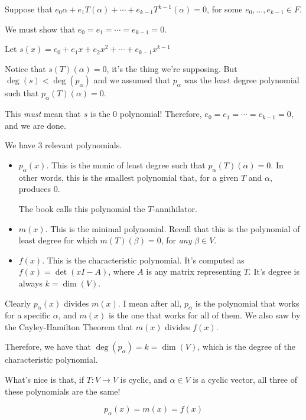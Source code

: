 \documentclass[12pt]{article}
\begin{document}
\begin{enumerate}
      Suppose that $e_0 \alpha + e_1 T(\alpha) + \cdots + e_{k - 1} T^{k - 1}
      (\alpha) = 0$, for some $e_0, \dots, e_{k - 1} \in F$.

      We must show that $e_0 = e_1 = \cdots = e_{k - 1} = 0$.

      Let $s(x) = e_0 + e_1 x + e_2 x^2 + \cdots + e_{k - 1} x^{k - 1}$

      Notice that $s(T)(\alpha) = 0$, it's the thing we're supposing. But
      $\deg(s) < \deg(p_\alpha)$ and we assumed that $p_\alpha$ was the least
      degree polynomial such that $p_\alpha(T)(\alpha) = 0$.

      This {\it must} mean that $s$ is the 0 polynomial! Therefore, $e_0 = e_1 =
      \cdots = e_{k - 1} = 0$, and we are done.
  \end{enumerate}

  We have 3 relevant polynomials.

  \begin{itemize}
    \item $p_\alpha(x)$. This is the monic of least degree such that
      $p_\alpha(T)(\alpha) = 0$. In other words, this is the smallest polynomial
      that, for a given $T$ and $\alpha$, produces 0.

      The book calls this polynomial the $T$-annihilator.

    \item $m(x)$. This is the minimal polynomial. Recall that this is the
      polynomial of least degree for which $m(T)(\beta) = 0$, for {\it any}
      $\beta \in V$.

    \item $f(x)$. This is the characteristic polynomial. It's computed as $f(x)
      = \det(xI - A)$, where $A$ is any matrix representing $T$. It's degree is
      always $k = \dim(V)$.
  \end{itemize}

  Clearly $p_\alpha(x)$ divides $m(x)$. I mean after all, $p_\alpha$ is the
  polynomial that works for a specific $\alpha$, and $m(x)$ is the one that
  works for all of them. We also saw by the Cayley-Hamilton Theorem that $m(x)$
  divides $f(x)$.

  Therefore, we have that $\deg(p_\alpha) = k = \dim(V)$, which is the degree of
  the characteristic polynomial.

  What's nice is that, if $T: V \to V$ is cyclic, and $\alpha \in V$ is a cyclic
  vector, all three of these polynomials are the same!

  \[
    p_\alpha(x) = m(x) = f(x)
  \]
\end{document}
